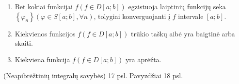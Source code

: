 \begin{prop}
  \begin{enumerate}
    \item Bet kokiai funkcijai $f (f \in D[a; b])$ egzistuoja laiptinių
      funkcijų seka 
      $\left\{ \varphi_{n} \right\} (\varphi \in S[a; b], \forall n)$,
      tolygiai konverguojanti į $f$ intervale $[a; b]$.
    \item Kiekvienos funkcijos $f (f \in D[a; b])$ trūkio taškų aibė
      yra baigtinė arba skaiti.
    \item Kiekviena funkcija $f (f \in D[a; b])$ yra aprėžta.
  \end{enumerate}
\end{prop}

\begin{prop}
  (Neapibrėžtinių integralų savybės) 17 psl.
  Pavyzdžiai 18 psl.
\end{prop}

